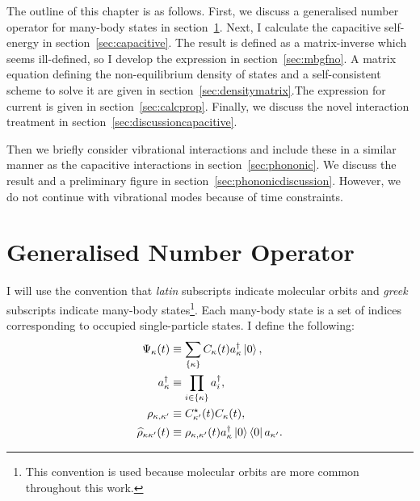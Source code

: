 The outline of this chapter is as follows. First, we discuss a generalised number operator for many-body states in section~\ref{sec:gno}. Next, I calculate the capacitive self-energy in section~\ref{sec:capacitive}. The result is defined as a matrix-inverse which seems ill-defined, so I develop the expression in section~\ref{sec:mbgfno}. A matrix equation defining the non-equilibrium density of states and a self-consistent scheme to solve it are given in section~\ref{sec:densitymatrix}.The expression for current is given in section~\ref{sec:calcprop}. Finally, we discuss the novel interaction treatment in section~\ref{sec:discussioncapacitive}.

Then we briefly consider vibrational interactions and include these in a similar manner as the capacitive interactions in section~\ref{sec:phononic}. We discuss the result and a preliminary figure in section~\ref{sec:phononicdiscussion}. However, we do not continue with vibrational modes because of time constraints.
\section{Generalised Number Operator}
\label{sec:gno}


I will use the convention that \emph{latin} subscripts indicate molecular orbits and \emph{greek} subscripts indicate many-body states\footnote{This convention is used because molecular orbits are more common throughout this work.}. Each many-body state is a set of indices corresponding to occupied single-particle states. I define the following:
\begin{align*}
\Psi_\kappa (t) &\equiv \sum_{ \left\{\kappa\right\}} C_\kappa(t) a_\kappa^\dagger \ket{0}, \\
a^\dagger_\kappa &\equiv \prod_{ i \in \left\{\kappa\right\}} a_i^\dagger, \\
\rho_{\kappa,\kappa^\prime} & \equiv C_{\kappa'}^\star (t) C_\kappa (t),
\\
\widehat{\rho}_{\kappa\kappa^\prime}(t) &\equiv \rho_{\kappa,\kappa^\prime} (t) a_{\kappa}^\dagger \ket{0}\bra{0}a_{\kappa^\prime}.
\end{align*}

